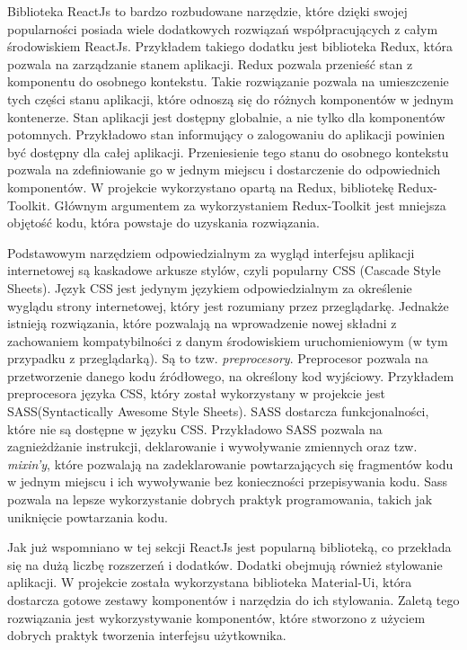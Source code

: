 \documentclass[a4paper,12pt]{book}
\begin{document}
Biblioteka ReactJs to bardzo rozbudowane narzędzie, które dzięki swojej popularności posiada wiele dodatkowych rozwiązań współpracujących z całym środowiskiem ReactJs. Przykładem takiego dodatku jest biblioteka Redux, która pozwala na zarządzanie stanem aplikacji. Redux pozwala przenieść stan z komponentu do osobnego kontekstu. Takie rozwiązanie pozwala na umieszczenie tych części stanu aplikacji, które odnoszą się do różnych komponentów w jednym kontenerze. Stan aplikacji jest dostępny globalnie, a nie tylko dla komponentów potomnych. Przykładowo stan informujący o zalogowaniu do aplikacji powinien być dostępny dla całej aplikacji. Przeniesienie tego stanu do osobnego kontekstu pozwala na zdefiniowanie go w jednym miejscu i dostarczenie do odpowiednich komponentów. W projekcie wykorzystano opartą na Redux, bibliotekę Redux-Toolkit. Głównym argumentem za wykorzystaniem Redux-Toolkit jest mniejsza objętość kodu, która powstaje do uzyskania rozwiązania.

Podstawowym narzędziem odpowiedzialnym za wygląd interfejsu aplikacji internetowej są kaskadowe arkusze stylów, czyli popularny CSS (Cascade Style Sheets). Język CSS jest jedynym językiem odpowiedzialnym za określenie wyglądu strony internetowej, który jest rozumiany przez przeglądarkę. Jednakże istnieją rozwiązania, które pozwalają na wprowadzenie nowej składni z zachowaniem kompatybilności z danym środowiskiem uruchomieniowym (w tym przypadku z przeglądarką). Są to tzw. \textit{preprocesory}. Preprocesor pozwala na przetworzenie danego kodu źródłowego, na określony kod wyjściowy. Przykładem preprocesora języka CSS, który został wykorzystany w projekcie jest SASS(Syntactically Awesome Style Sheets). SASS dostarcza funkcjonalności, które nie są dostępne w języku CSS. Przykładowo SASS pozwala na zagnieżdżanie instrukcji, deklarowanie i wywoływanie zmiennych oraz tzw. \textit{mixin'y}, które pozwalają na zadeklarowanie powtarzających się fragmentów kodu w jednym miejscu i ich wywoływanie bez konieczności przepisywania kodu. Sass pozwala na lepsze wykorzystanie dobrych praktyk programowania, takich jak uniknięcie powtarzania kodu.

Jak już wspomniano w tej sekcji ReactJs jest popularną biblioteką, co przekłada się na dużą liczbę rozszerzeń i dodatków. Dodatki obejmują również stylowanie aplikacji. W projekcie została wykorzystana biblioteka Material-Ui, która dostarcza gotowe zestawy komponentów i narzędzia do ich stylowania. Zaletą tego rozwiązania jest wykorzystywanie komponentów, które stworzono z użyciem dobrych praktyk tworzenia interfejsu użytkownika.
\end{document}
